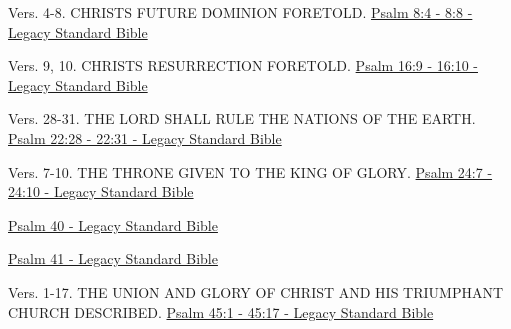 \documentclass[
  ignorenonframetext,
]{beamer}
\begin{document}
\begin{frame}{8}
\label{section-17}
\begin{block}{Vers. 4-8. CHRIST\textquotesingle S FUTURE DOMINION
FORETOLD.}
\label{vers.-4-8.-christs-future-dominion-foretold.}
\href{https://read.lsbible.org/?q=ps8\%3A4-8}{Psalm 8:4 - 8:8 - Legacy
Standard Bible}
\end{block}
\end{frame}

\begin{frame}{16}
\label{section-18}
\begin{block}{Vers. 9, 10. CHRIST\textquotesingle S RESURRECTION
FORETOLD.}
\label{vers.-9-10.-christs-resurrection-foretold.}
\href{https://read.lsbible.org/?q=ps16\%3A9-10}{Psalm 16:9 - 16:10 -
Legacy Standard Bible}
\end{block}
\end{frame}

\begin{frame}{22}
\label{section-19}
\begin{block}{Vers. 28-31. THE LORD SHALL RULE THE NATIONS OF THE
EARTH.}
\label{vers.-28-31.-the-lord-shall-rule-the-nations-of-the-earth.}
\href{https://read.lsbible.org/?q=ps22\%3A28-31}{Psalm 22:28 - 22:31 -
Legacy Standard Bible}
\end{block}
\end{frame}

\begin{frame}{24}
\label{section-20}
\begin{block}{Vers. 7-10. THE THRONE GIVEN TO THE KING OF GLORY.}
\label{vers.-7-10.-the-throne-given-to-the-king-of-glory.}
\href{https://read.lsbible.org/?q=ps24\%3A7-10}{Psalm 24:7 - 24:10 -
Legacy Standard Bible}
\end{block}
\end{frame}

\begin{frame}{40}
\label{section-21}
\href{https://read.lsbible.org/?q=ps40}{Psalm 40 - Legacy Standard
Bible}
\end{frame}

\begin{frame}{41}
\label{section-22}
\href{https://read.lsbible.org/?q=ps41}{Psalm 41 - Legacy Standard
Bible}
\end{frame}

\begin{frame}{45}
\label{section-23}
\begin{block}{Vers. 1-17. THE UNION AND GLORY OF CHRIST AND HIS
TRIUMPHANT CHURCH DESCRIBED.}
\label{vers.-1-17.-the-union-and-glory-of-christ-and-his-triumphant-church-described.}
\href{https://read.lsbible.org/?q=ps45\%3A1-17}{Psalm 45:1 - 45:17 -
Legacy Standard Bible}
\end{block}
\end{frame}
\end{document}
